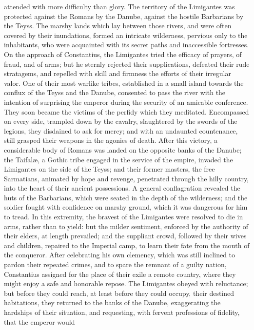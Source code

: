 attended with more difficulty than glory. The territory of the
Limigantes was protected against the Romans by the Danube,
against the hostile Barbarians by the Teyss. The marshy lands
which lay between those rivers, and were often covered by their
inundations, formed an intricate wilderness, pervious only to the
inhabitants, who were acquainted with its secret paths and
inaccessible fortresses. On the approach of Constantius, the
Limigantes tried the efficacy of prayers, of fraud, and of arms;
but he sternly rejected their supplications, defeated their rude
stratagems, and repelled with skill and firmness the efforts of
their irregular valor. One of their most warlike tribes,
established in a small island towards the conflux of the Teyss
and the Danube, consented to pass the river with the intention of
surprising the emperor during the security of an amicable
conference. They soon became the victims of the perfidy which
they meditated. Encompassed on every side, trampled down by the
cavalry, slaughtered by the swords of the legions, they disdained
to ask for mercy; and with an undaunted countenance, still
grasped their weapons in the agonies of death. After this
victory, a considerable body of Romans was landed on the opposite
banks of the Danube; the Taifalæ, a Gothic tribe engaged in the
service of the empire, invaded the Limigantes on the side of the
Teyss; and their former masters, the free Sarmatians, animated by
hope and revenge, penetrated through the hilly country, into the
heart of their ancient possessions. A general conflagration
revealed the huts of the Barbarians, which were seated in the
depth of the wilderness; and the soldier fought with confidence
on marshy ground, which it was dangerous for him to tread. In
this extremity, the bravest of the Limigantes were resolved to
die in arms, rather than to yield: but the milder sentiment,
enforced by the authority of their elders, at length prevailed;
and the suppliant crowd, followed by their wives and children,
repaired to the Imperial camp, to learn their fate from the mouth
of the conqueror. After celebrating his own clemency, which was
still inclined to pardon their repeated crimes, and to spare the
remnant of a guilty nation, Constantius assigned for the place of
their exile a remote country, where they might enjoy a safe and
honorable repose. The Limigantes obeyed with reluctance; but
before they could reach, at least before they could occupy, their
destined habitations, they returned to the banks of the Danube,
exaggerating the hardships of their situation, and requesting,
with fervent professions of fidelity, that the emperor would

